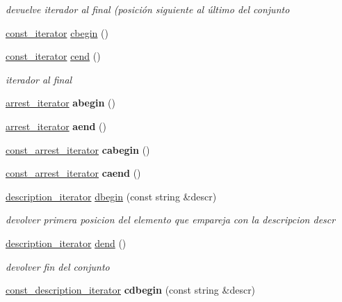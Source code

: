 \begin{DoxyCompactItemize}
\begin{DoxyCompactList}\small\item\em devuelve iterador al final (posición siguiente al último del conjunto \end{DoxyCompactList}\item 
\hyperlink{classconjunto_1_1const__iterator}{const\-\_\-iterator} \hyperlink{classconjunto_a9083639d263694ac8fd59224dcce2f0f}{cbegin} ()
\item 
\hyperlink{classconjunto_1_1const__iterator}{const\-\_\-iterator} \hyperlink{classconjunto_a3229719c844a91eff13a2b174b875637}{cend} ()
\begin{DoxyCompactList}\small\item\em iterador al final \end{DoxyCompactList}\item 
\hypertarget{classconjunto_aae3e108ee38c624ca0a1f5e11fe7a1b0}{\hyperlink{classconjunto_1_1arrest__iterator}{arrest\-\_\-iterator} {\bfseries abegin} ()}\label{classconjunto_aae3e108ee38c624ca0a1f5e11fe7a1b0}

\item 
\hypertarget{classconjunto_a4464a19d9757c22306815d66749d072c}{\hyperlink{classconjunto_1_1arrest__iterator}{arrest\-\_\-iterator} {\bfseries aend} ()}\label{classconjunto_a4464a19d9757c22306815d66749d072c}

\item 
\hypertarget{classconjunto_acc4b0c0f036cbffebf4e8440206103b6}{\hyperlink{classconjunto_1_1const__arrest__iterator}{const\-\_\-arrest\-\_\-iterator} {\bfseries cabegin} ()}\label{classconjunto_acc4b0c0f036cbffebf4e8440206103b6}

\item 
\hypertarget{classconjunto_af162d00713358699bc36300616c90e89}{\hyperlink{classconjunto_1_1const__arrest__iterator}{const\-\_\-arrest\-\_\-iterator} {\bfseries caend} ()}\label{classconjunto_af162d00713358699bc36300616c90e89}

\item 
\hyperlink{classconjunto_1_1description__iterator}{description\-\_\-iterator} \hyperlink{classconjunto_a67554c4c219143b596ba82ec29508e93}{dbegin} (const string \&descr)
\begin{DoxyCompactList}\small\item\em devolver primera posicion del elemento que empareja con la descripcion descr \end{DoxyCompactList}\item 
\hyperlink{classconjunto_1_1description__iterator}{description\-\_\-iterator} \hyperlink{classconjunto_af821d3bc50f2926a95aaa39a04c1ce7e}{dend} ()
\begin{DoxyCompactList}\small\item\em devolver fin del conjunto \end{DoxyCompactList}\item 
\hypertarget{classconjunto_a518331306c092e8b87742cd98bf7c090}{\hyperlink{classconjunto_1_1const__description__iterator}{const\-\_\-description\-\_\-iterator} {\bfseries cdbegin} (const string \&descr)}\label{classconjunto_a518331306c092e8b87742cd98bf7c090}


\end{DoxyCompactItemize}
